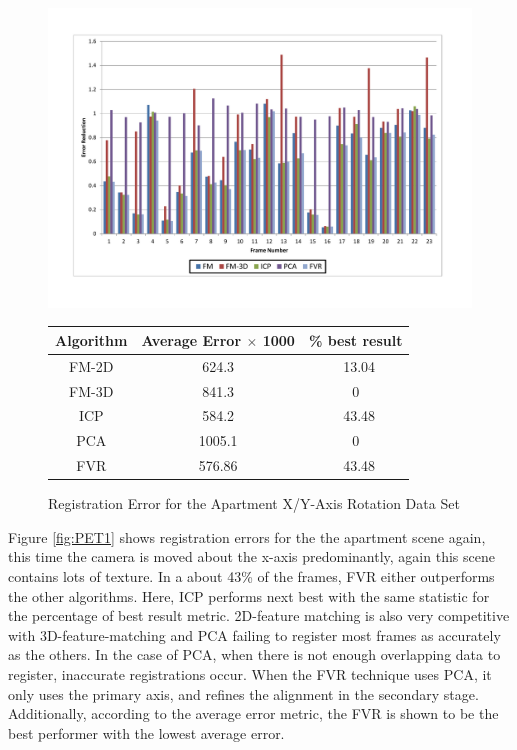 \begin{figure}
\centering
\includegraphics[width=6in]{images/results/Apartment_Texture_Rotate_XAxis}
\caption{Registration Error for the Apartment X/Y-Axis Rotation Data Set}
\label{fig:PET1}

\begin{tabular}{ccc}
\hline
\textbf{Algorithm} & \textbf{Average Error $\times$ 1000} & \textbf{\% best result}\\ \hline
FM-2D	& 624.3 & ~13.04\\
FM-3D	& 841.3 & 0\\
ICP		& 584.2 & ~43.48\\
PCA		& 1005.1 & 0\\
FVR		& 576.86 & ~43.48\\
\end{tabular}
\label{tab:PET1ST}
\end{figure} 



Figure \ref{fig:PET1} shows registration errors for the the apartment scene again, this time the camera is moved about the x-axis predominantly, again this scene contains lots of texture. In a about 43\% of the frames, FVR either outperforms the other algorithms. Here, ICP performs next best with the same statistic for the percentage of best result metric. 2D-feature matching is also very competitive with 3D-feature-matching and PCA failing to register most frames as accurately as the others. In the case of PCA, when there is not enough overlapping data to register, inaccurate registrations occur. When the FVR technique uses PCA, it only uses the primary axis, and refines the alignment in the secondary stage. Additionally, according to the average error metric, the FVR is shown to be the best performer with the lowest average error. \\


